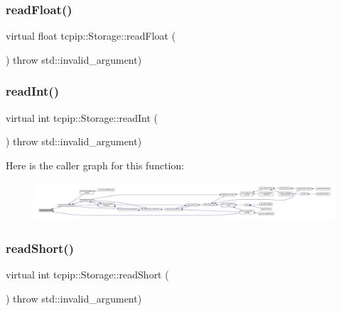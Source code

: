 \subsubsection{\texorpdfstring{read\+Float()}{readFloat()}}
{\footnotesize\ttfamily virtual float tcpip\+::\+Storage\+::read\+Float (\begin{DoxyParamCaption}{ }\end{DoxyParamCaption}) throw  std\+::invalid\+\_\+argument) \hspace{0.3cm}{\ttfamily [virtual]}}

\mbox{\label{classtcpip_1_1_storage_a04d2fd214a905ad99e9cda8ee7b813e4}} 
\subsubsection{\texorpdfstring{read\+Int()}{readInt()}}
{\footnotesize\ttfamily virtual int tcpip\+::\+Storage\+::read\+Int (\begin{DoxyParamCaption}{ }\end{DoxyParamCaption}) throw  std\+::invalid\+\_\+argument) \hspace{0.3cm}{\ttfamily [virtual]}}

Here is the caller graph for this function\+:
\nopagebreak
\begin{figure}[H]
\begin{center}
\leavevmode
\includegraphics[width=350pt]{classtcpip_1_1_storage_a04d2fd214a905ad99e9cda8ee7b813e4_icgraph}
\end{center}
\end{figure}
\mbox{\label{classtcpip_1_1_storage_a73b9af4fa50e74cb02390240f30fa0c9}} 
\subsubsection{\texorpdfstring{read\+Short()}{readShort()}}
{\footnotesize\ttfamily virtual int tcpip\+::\+Storage\+::read\+Short (\begin{DoxyParamCaption}{ }\end{DoxyParamCaption}) throw  std\+::invalid\+\_\+argument) \hspace{0.3cm}{\ttfamily [virtual]}}

